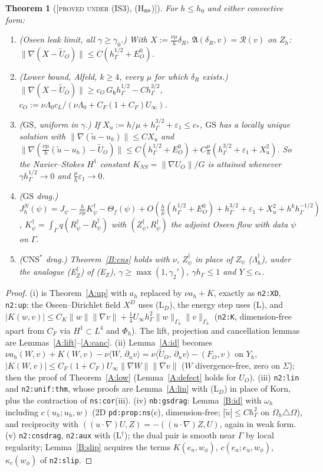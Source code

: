\documentclass[11pt,reqno]{amsart}
\theoremstyle{plain}
\newtheorem{theorem}{Theorem}[section]
\theoremstyle{definition}
\newcommand{\status}[1]{\textup{\textsc{[#1]}}}
\newcommand{\hG}{h_\Gamma}
\newcommand{\Gh}{\Gamma_h}
\newcommand{\Oh}{\Omega_h}
\newcommand{\Zh}{Z_h}
\newcommand{\dn}{\partial_n}
\newcommand{\ut}{\tilde u}
\newcommand{\ip}[2]{\langle #1,\, #2\rangle}
\newcommand{\norm}[1]{\lVert #1\rVert}
\newcommand{\GS}{\mathrm{GS}}
\newcommand{\CNS}{\mathrm{CNS}^\ast}
\newcommand{\Rc}{\mathcal R}
\newcommand{\hh}{\mathfrak h}
\newcommand{\Aop}{\mathfrak A}
\newcommand{\Ut}{\tilde U}
\newcommand{\Yh}{Y_h}
\begin{document}
\begin{theorem}[\status{proved under (IS3), (H$_{\rm ns}$)}]\label{C:all}
For $h\le h_0$ and either convective form:
\begin{enumerate}[label=(\roman*)]
\item (Oseen leak limit, all $\gamma\ge\gamma_0$.) With $X:=\frac{\nu\mu}h\delta_R$, $\Aop(\delta_R,v)=\Rc(v)$ on $\Zh$: $\norm{\nabla(X-\Ut_O)}\le C(\hG^{1/2}+E^0_O)$.
\item (Lower bound, Alfeld, $k\ge4$, every $\mu$ for which $\delta_R$ exists.) $\norm{\nabla(X-\Ut_O)}\ge c_O\,G_\hh\hG^{1/2}-C\hG^{3/2}$, $c_O:=\nu\Lambda_0c_L/(\nu\Lambda_0+C_F(1+C_F)U_\infty)$.
\item ($\GS$, uniform in $\gamma$.) If $X_u:=h/\mu+\hG^{3/2}+\varepsilon_1\le c_\ast$, $\GS$ has a locally unique solution with $\norm{\nabla(\ut-u_h)}\le CX_u$ and $\norm{\nabla(\frac{\nu\mu}h(\ut-u_h)-\Ut_O)}\le C(\hG^{1/2}+E^0_O)+C\frac\mu h(\hG^{3/2}+\varepsilon_1+X_u^2)$. So the Navier--Stokes $H^1$ constant $K_{NS}=\norm{\nabla U_O}/G$ is attained whenever $\gamma\hG^{1/2}\to0$ and $\frac\mu h\varepsilon_1\to0$.
\item ($\GS$ drag.) $J^N_h(\psi)=J_\psi-\frac h{\nu\mu}K^\dagger_\psi-\Theta_f(\psi)+O(\frac h\mu(\hG^{1/2}+E^0_O)+\hG^{3/2}+\varepsilon_1+X_u^2+h^k\hG^{-1/2})$, $K^\dagger_\psi=\int_\Gamma q(R^\dagger_\psi-\bar R^\dagger_\psi)$ with $(Z^\dagger_\psi,R^\dagger_\psi)$ the adjoint Oseen flow with data $\psi$ on $\Gamma$.
\item ($\CNS$ drag.) Theorem~\ref{B:cns} holds with $\nu$, $Z^\dagger_\psi$ in place of $Z_\psi$ ($\Lambda^\dagger_h$), under the analogue (E$_Z^\dagger$) of (E$_Z$), $\gamma\ge\max(1,\gamma_2')$, $\gamma\hG\le1$ and $Y\le c_\ast$.
\end{enumerate}
\end{theorem}
\begin{proof}
(i) is Theorem~\ref{A:up} with $a_h$ replaced by $\nu a_h+K$, exactly as \texttt{n2:XD}, \texttt{n2:up}: the Oseen--Dirichlet field $X^D$ uses (L$_D$), the energy step uses (L), and $|K(w,v)|\le C_K\norm w\norm{\nabla v}+\frac14U_\infty\hG^2\norm w_{\Gh}\norm v_{\Gh}$ (\texttt{n2:K}, dimension-free apart from $C_F$ via $H^1\subset L^4$ and $\Phi_h$). The lift, projection and cancellation lemmas are Lemmas~\ref{A:lift}--\ref{A:canc}. (ii) Lemma~\ref{A:id} becomes $\nu a_h(W,v)+K(W,v)-\nu\ip W{\dn v}=\nu\ip{\Ut_O}{\dn v}-(F_O,v)$ on $\Yh$, $|K(W,v)|\le C_F(1+C_F)U_\infty\norm{\nabla W}\norm{\nabla v}$ ($W$ divergence-free, zero on $\Sigma$); then the proof of Theorem~\ref{A:low} (Lemma~\ref{A:defect} holds for $U_O$). (iii) \texttt{n2:lin} and \texttt{n2:unif:thm}, whose proofs are Lemma~\ref{A:lin} with (L$_D$) in place of Korn, plus the contraction of \texttt{ns:cor}(iii). (iv) \texttt{nb:gsdrag}: Lemma~\ref{B:id} with $\omega_h$ including $c(u_h;u_h,w)$ (2D \texttt{pd:prop:ns}(c), dimension-free; $|\ut|\le C\hG^2$ on $\Oh\triangle\Omega$), and reciprocity with $((u\cdot\nabla)U,Z)=-((u\cdot\nabla)Z,U)$, again in weak form. (v) \texttt{n2:cnsdrag}, \texttt{n2:aux} with (L$^\dagger$); the dual pair is smooth near $\Gamma$ by local regularity; Lemma~\ref{B:slip} acquires the terms $K(e_u,w_\phi)$, $c(e_u;e_u,w_\phi)$, $\kappa_c(w_\phi)$ of \texttt{n2:slip}.
\end{proof}
\end{document}
